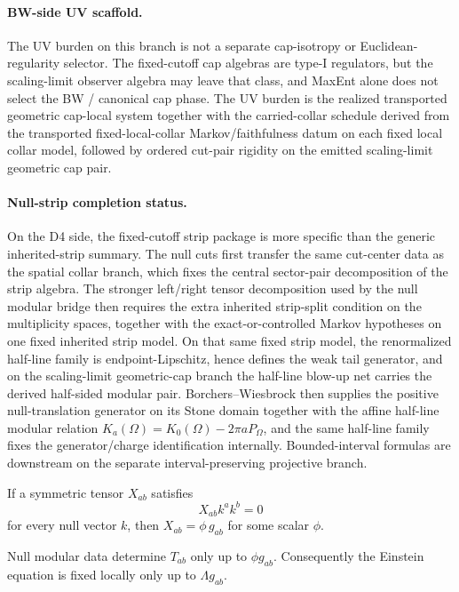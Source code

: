 \paragraph{BW-side UV scaffold.}
The UV burden on this branch is not a separate cap-isotropy or Euclidean-regularity
selector. The fixed-cutoff cap algebras are type-I regulators, but the scaling-limit observer
algebra may leave that class, and MaxEnt alone does not select the BW / canonical cap phase. The
UV burden is the realized transported geometric cap-local system together with the
carried-collar schedule derived from the transported fixed-local-collar Markov/faithfulness datum
on each fixed local collar model, followed by ordered cut-pair rigidity on the emitted
scaling-limit geometric cap pair.

\paragraph{Null-strip completion status.}
On the D4 side, the fixed-cutoff strip package is more specific than the generic inherited-strip summary.
The null cuts first transfer the same cut-center data as the spatial collar branch, which fixes
the central sector-pair decomposition of the strip algebra. The stronger left/right tensor
decomposition used by the null modular bridge then requires the extra inherited strip-split
condition on the multiplicity spaces, together with the exact-or-controlled Markov hypotheses on
one fixed inherited strip model. On that same fixed strip model, the renormalized half-line family
is endpoint-Lipschitz, hence defines the weak tail generator, and on the scaling-limit
geometric-cap branch the half-line blow-up net carries the derived half-sided modular pair.
Borchers--Wiesbrock then supplies the positive null-translation generator on its Stone domain
together with the affine half-line modular relation \(K_a(\Omega)=K_0(\Omega)-2\pi aP_\Omega\),
and the same half-line family fixes the generator/charge identification internally.
Bounded-interval formulas are downstream on the separate interval-preserving projective branch.

\begin{lemma}
If a symmetric tensor \(X_{ab}\) satisfies
\[
X_{ab}k^ak^b=0
\]
for every null vector \(k\), then \(X_{ab}=\phi\,g_{ab}\) for some scalar \(\phi\).
\end{lemma}

\begin{corollary}
Null modular data determine \(T_{ab}\) only up to \(\phi g_{ab}\). Consequently the Einstein
equation is fixed locally only up to \(\Lambda g_{ab}\).
\end{corollary}

